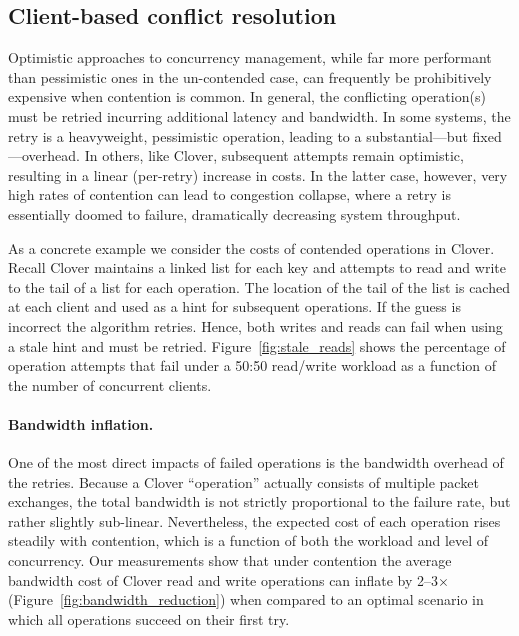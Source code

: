 \subsection{Client-based conflict resolution}

Optimistic approaches to concurrency management, while far more
performant than pessimistic ones in the un-contended case, can
frequently be prohibitively expensive when contention is common.  In
general, the conflicting operation(s) must be retried incurring
additional latency and bandwidth.  In some systems, the retry is a
heavyweight, pessimistic operation, leading to a substantial---but
fixed---overhead.  In others, like Clover, subsequent attempts remain
optimistic, resulting in a linear (per-retry) increase in costs.
In the latter case, however, very high rates of contention can lead to
congestion collapse, where a retry is essentially doomed to failure,
dramatically decreasing system throughput.

As a concrete example we consider the costs of contended operations in
Clover.  Recall Clover maintains a linked list for each key and
attempts to read and write to the tail of a list for each
operation. The location of the tail of the list is cached at each
client and used as a hint for subsequent operations.  If the guess is
incorrect the algorithm retries.  Hence, both writes and reads can
fail when using a stale hint and must be retried.
Figure~\ref{fig:stale_reads} shows the percentage of operation
attempts that fail under a 50:50 read/write workload as a function of
the number of concurrent clients.

\paragraph{Bandwidth inflation.} 

One of the most direct impacts of failed operations is the bandwidth
overhead of the retries.  Because a Clover ``operation'' actually
consists of multiple packet exchanges, the total bandwidth is not
strictly proportional to the failure rate, but rather slightly
sub-linear.  Nevertheless, the expected cost of each operation rises
steadily with contention, which is a function of both the workload and
level of concurrency.  Our measurements show that under contention the
average bandwidth cost of Clover read and write operations can inflate
by 2--3$\times$ (Figure~\ref{fig:bandwidth_reduction}) when compared
to an optimal scenario in which all operations succeed on their first
try.


